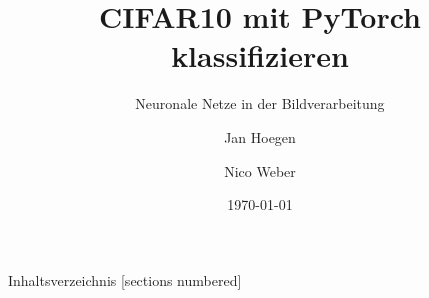 \documentclass[
  fontsize=10pt, 
  aspectratio=169,
  xcolor={dvipsnames}
]{beamer}
\title{CIFAR10 mit PyTorch klassifizieren}
\subtitle{Neuronale Netze in der Bildverarbeitung}
\date{\today}
\author{Jan Hoegen \and Nico Weber}
\institute{
  Hochschule Karlsruhe\\
  University of Applied Sciences
}
\begin{document}
  \maketitle

  \begin{frame}{Inhaltsverzeichnis}
    [sections numbered]
    \tableofcontents[hideallsubsections]
  \end{frame}

  

  

  

  

  










\end{document}
